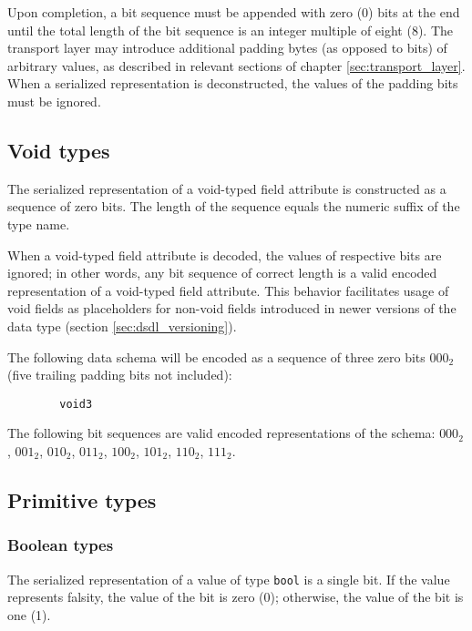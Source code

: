 Upon completion, a bit sequence must be appended with zero (0) bits at the end until the total length of
the bit sequence is an integer multiple of eight (8).
The transport layer may introduce additional padding bytes (as opposed to bits) of arbitrary values,
as described in relevant sections of chapter \ref{sec:transport_layer}.
When a serialized representation is deconstructed, the values of the padding bits must be ignored.

\subsection{Void types}

The serialized representation of a void-typed field attribute is constructed as a sequence of zero bits.
The length of the sequence equals the numeric suffix of the type name.

When a void-typed field attribute is decoded, the values of respective bits are ignored;
in other words, any bit sequence of correct length is a valid encoded representation of a void-typed field attribute.
This behavior facilitates usage of void fields as placeholders for non-void fields
introduced in newer versions of the data type (section \ref{sec:dsdl_versioning}).

\begin{remark}
    The following data schema will be encoded as a sequence of three zero bits $000_2$
    (five trailing padding bits not included):
    \begin{verbatim}
        void3
    \end{verbatim}
    The following bit sequences are valid encoded representations of the schema:
    $000_2$,
    $001_2$,
    $010_2$,
    $011_2$,
    $100_2$,
    $101_2$,
    $110_2$,
    $111_2$.
\end{remark}

\subsection{Primitive types}

\subsubsection{Boolean types}

The serialized representation of a value of type \verb|bool| is a single bit.
If the value represents falsity, the value of the bit is zero (0); otherwise, the value of the bit is one (1).

